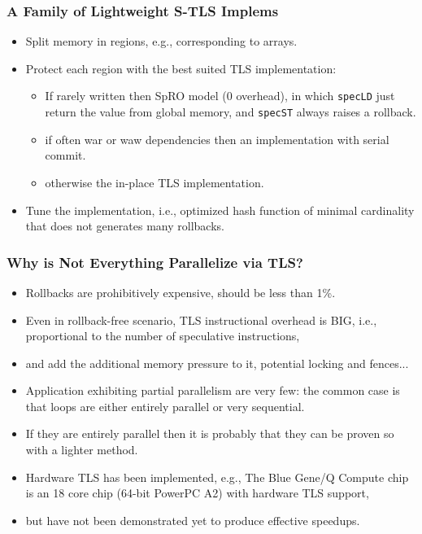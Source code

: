 \documentclass{beamer}
\begin{document}
\begin{frame}[fragile,t]
  \frametitle{A Family of Lightweight S-TLS Implems}

        \begin{itemize}
            \item Split memory in regions, e.g., corresponding to arrays.\medskip
            \item Protect each region with the best suited TLS implementation:\pause
            \begin{itemize}
                \item If rarely written then SpRO model (0 overhead), 
                        in which {\tt specLD}
                        just return the value from global memory, and 
                        {\tt specST} always raises a rollback.
                \item if often {\sc war} or {\sc waw} dependencies then
                        an implementation with serial commit.
                \item otherwise the in-place TLS implementation.
            \end{itemize}\medskip
            \item Tune the implementation, i.e., optimized hash function of
                minimal cardinality that does not generates many rollbacks. \bigskip            
        \end{itemize}
\end{frame}

\begin{frame}[fragile,t]
  \frametitle{Why is Not Everything Parallelize via TLS?}
\pause
        \begin{itemize}
            \item Rollbacks are prohibitively expensive, should be less than 1\%.\medskip

            \item Even in rollback-free scenario, TLS instructional overhead 
                    is BIG, i.e., proportional to the number of speculative 
                    instructions,\medskip
 
            \item and add the additional memory pressure to it, potential locking and fences...\medskip

            \item Application exhibiting partial parallelism are very few: the common case
                    is that loops are either entirely parallel or very sequential.\medskip

            \item If they are entirely parallel then it is probably that they can be proven
                    so with a lighter method.\medskip

            \item Hardware TLS has been implemented, e.g., The Blue Gene/Q Compute 
                chip is an 18 core chip (64-bit PowerPC A2) with hardware TLS support,\medskip

            \item but have not been demonstrated yet to produce effective speedups.
        \end{itemize}
\end{frame}
\end{document}
